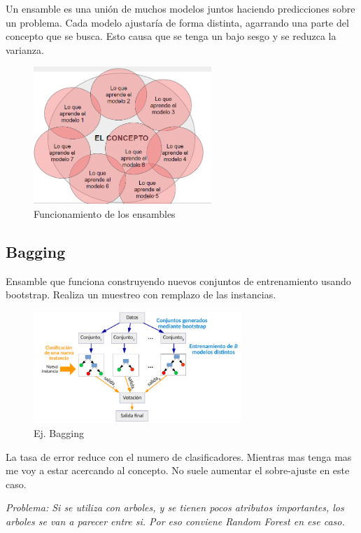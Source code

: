 \documentclass[titlepage,a4paper]{article}
\begin{document}
Un ensamble es una unión de muchos modelos juntos haciendo predicciones sobre un problema. Cada modelo ajustaría de forma distinta, agarrando una parte del concepto que se busca. Esto causa que se tenga un bajo sesgo y se reduzca la varianza.

\begin{figure}[!htb]
    \centering
    \includegraphics[width=0.6\textwidth]{imagenesResumen/ConceptoEnsamble.PNG}
    \caption{Funcionamiento de los ensambles}
\end{figure}

\subsection{Bagging}

Ensamble que funciona construyendo nuevos conjuntos de entrenamiento usando bootstrap. Realiza un muestreo con remplazo de las instancias.

\begin{figure}[!htb]
    \centering
    \includegraphics[width=0.7\textwidth]{imagenesResumen/Bagging.PNG}
    \caption{Ej. Bagging}
\end{figure}

La tasa de error reduce con el numero de clasificadores. Mientras mas tenga mas me voy a estar acercando al concepto. No suele aumentar el sobre-ajuste en este caso.

\textit{Problema: Si se utiliza con arboles, y se tienen pocos atributos importantes, los arboles se van a parecer entre si. Por eso conviene Random Forest en ese caso.}
\end{document}
